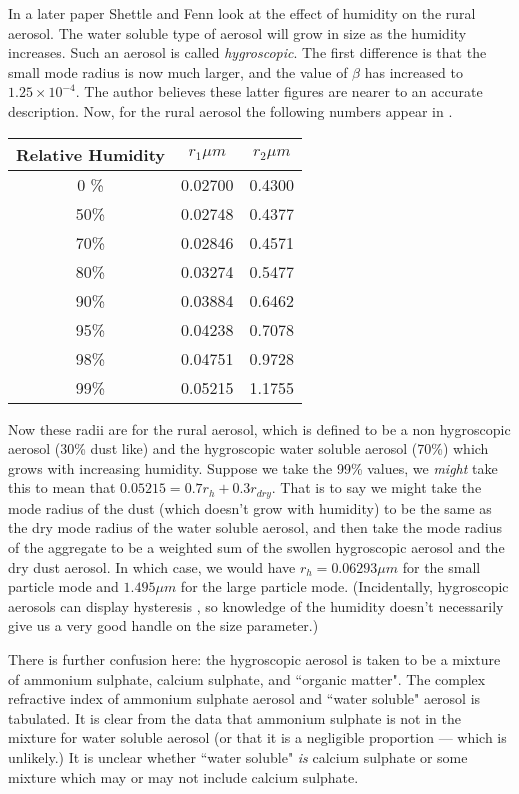 \documentclass[12pt]{article}
\begin{document}
In a later paper Shettle and Fenn \cite{ShettleFenn:Mybib} look at the effect of humidity on the rural aerosol.
The water soluble type of aerosol will grow in size as the humidity increases.
Such an aerosol is called {\it hygroscopic}.
The first difference is that the small mode radius is now much larger,  and the value
of $\beta$ has increased to $1.25 \times 10^{-4}$. The author believes these latter figures are
 nearer to an accurate description. 
 Now, for the rural aerosol the following numbers appear in \cite{ShettleFenn:Mybib}.
\begin{center}
\begin{tabular}{| c | c | c | }
\hline
Relative Humidity&  $r_1 \mu m$ & $r_2 \mu m$ \\
\hline
 0 \% &  0.02700 & 0.4300 \\
 50\% &  0.02748 & 0.4377 \\
 70\% &  0.02846 & 0.4571 \\
 80\% &  0.03274 & 0.5477 \\
 90\% &  0.03884 & 0.6462 \\
 95\% &  0.04238 & 0.7078 \\
 98\% &  0.04751 & 0.9728 \\
 99\% &  0.05215 & 1.1755 \\
\hline
\end{tabular}
\end{center}
Now these radii are for the rural aerosol, which is defined to be a non
 hygroscopic aerosol (30\% dust like) and the hygroscopic water soluble aerosol
(70\%) which grows with increasing humidity.
 Suppose we  take the 99\% values, we {\it might}  take this to mean that
 $0.05215=0.7 r_h+0.3 r_{dry}$. That is to say we might take the mode 
radius of the dust (which doesn't grow with humidity) to be the same
 as the dry mode radius
of the water soluble aerosol, and then take the mode radius of the aggregate
to be a weighted sum of the swollen hygroscopic aerosol and the dry dust aerosol.
 In which case, we would have $r_h=0.06293 \mu m$
for the small particle mode
 and $1.495 \mu m$
for the large particle mode. (Incidentally, hygroscopic aerosols can display
hysteresis \cite{Samparta:Mybib}, so knowledge of the humidity doesn't necessarily give
us a very good handle on the size parameter.)

There is further confusion here: the hygroscopic aerosol is taken to be a mixture
 of ammonium sulphate, calcium sulphate, and ``organic matter". The complex
refractive index of ammonium sulphate aerosol and ``water soluble" aerosol is tabulated.
It is clear from the data that ammonium sulphate is not in the mixture for water
soluble aerosol (or that it is a negligible proportion --- which is unlikely.)
It is unclear whether ``water soluble" {\it is} calcium sulphate or some mixture
which may or may not include calcium sulphate.
\end{document}
